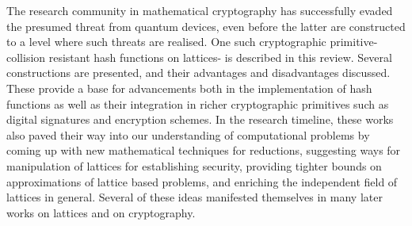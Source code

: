 \documentclass[10pt]{elsarticle}
\begin{document}
The research community in mathematical cryptography has successfully evaded the presumed threat from quantum devices, even before the latter are constructed to a level where such threats are realised. One such cryptographic primitive- collision resistant hash functions on lattices- is described in this review. Several constructions are presented, and their advantages and disadvantages discussed. These provide a base for advancements both in the implementation of hash functions as well as their integration in richer cryptographic primitives such as digital signatures and encryption schemes. In the research timeline, these works also paved their way into our understanding of computational problems by coming up with new mathematical techniques for reductions, suggesting ways for manipulation of lattices for establishing security, providing tighter bounds on approximations of lattice based problems, and enriching the independent field of lattices in general. Several of these ideas manifested themselves in many later works on lattices and on cryptography.
\end{document}
